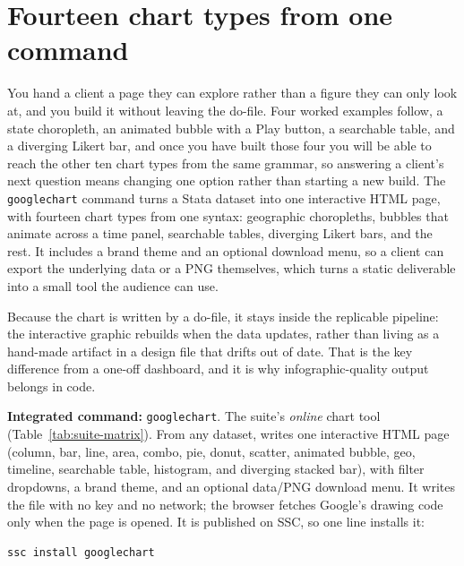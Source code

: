 \section{Fourteen chart types from one command}
You hand a client a page they can explore rather than a figure they can only look at, and you build it without leaving the do-file. Four worked examples follow, a state choropleth, an animated bubble with a Play button, a searchable table, and a diverging Likert bar, and once you have built those four you will be able to reach the other ten chart types from the same grammar, so answering a client's next question means changing one option rather than starting a new build. The \texttt{googlechart} command turns a Stata dataset into one interactive HTML page, with fourteen chart types from one syntax: geographic choropleths, bubbles that animate across a time panel, searchable tables, diverging Likert bars, and the rest. It includes a brand theme and an optional download menu, so a client can export the underlying data or a PNG themselves, which turns a static deliverable into a small tool the audience can use.

Because the chart is written by a do-file, it stays inside the replicable pipeline: the interactive graphic rebuilds when the data updates, rather than living as a hand-made artifact in a design file that drifts out of date. That is the key difference from a one-off dashboard, and it is why infographic-quality output belongs in code.

\begin{kaobox}[frametitle=Package Integration: \texttt{googlechart}]
\textbf{Integrated command:} \texttt{googlechart}. The suite's \emph{online} chart tool (Table~\ref{tab:suite-matrix}). From any dataset, writes one interactive HTML page (column, bar, line, area, combo, pie, donut, scatter, animated bubble, geo, timeline, searchable table, histogram, and diverging stacked bar), with filter dropdowns, a brand theme, and an optional data/PNG download menu. It writes the file with no key and no network; the browser fetches Google's drawing code only when the page is opened. It is published on SSC, so one line installs it:
\par
{\footnotesize
\begin{verbatim}
ssc install googlechart
\end{verbatim}
}
\end{kaobox}

